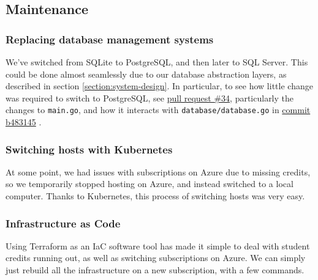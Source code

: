 \subsection{Maintenance}

\subsubsection{Replacing database management systems}

We've switched from SQLite to PostgreSQL, and then later to SQL Server. This could be done almost seamlessly due to our database abstraction layers, as described in section \ref{section:system-design}.
In particular, to see how little change was required to switch to PostgreSQL, see \href{https://github.com/Devops-2022-Group-R/itu-minitwit/pull/34}{pull request \#34}, particularly the changes to \texttt{main.go}, and how it interacts with \texttt{database/database.go} in \href{https://github.com/Devops-2022-Group-R/itu-minitwit/pull/34/commits/b4831458ae940e9b4c42dd929fe9be73143580d4#diff-9e185f29fa355d7dd8fdd9c9ff1d0723b85206aa7d37c4eec93997005dc291eb}{commit b483145} \cite{commit:switching-to-psql}.


\subsubsection{Switching hosts with Kubernetes}

At some point, we had issues with subscriptions on Azure due to missing credits, so we temporarily stopped hosting on Azure, and instead switched to a local computer. Thanks to Kubernetes, this process of switching hosts was very easy.


\subsubsection{Infrastructure as Code}

Using Terraform as an IaC software tool has made it simple to deal with student credits running out, as well as switching subscriptions on Azure. We can simply just rebuild all the infrastructure on a new subscription, with a few commands.
